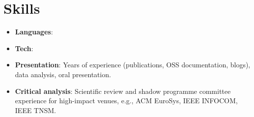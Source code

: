 \section{Skills}
\begin{itemize}[leftmargin=5.3em]
	\item \textbf{Languages}:
	\item \textbf{Tech}:
	\item \textbf{Presentation}: Years of  experience (publications, OSS documentation, blogs), data analysis, oral presentation.
	\item \textbf{Critical analysis}: Scientific review and shadow programme committee experience for high-impact venues, e.g., ACM EuroSys, IEEE INFOCOM, IEEE TNSM. 
\end{itemize}